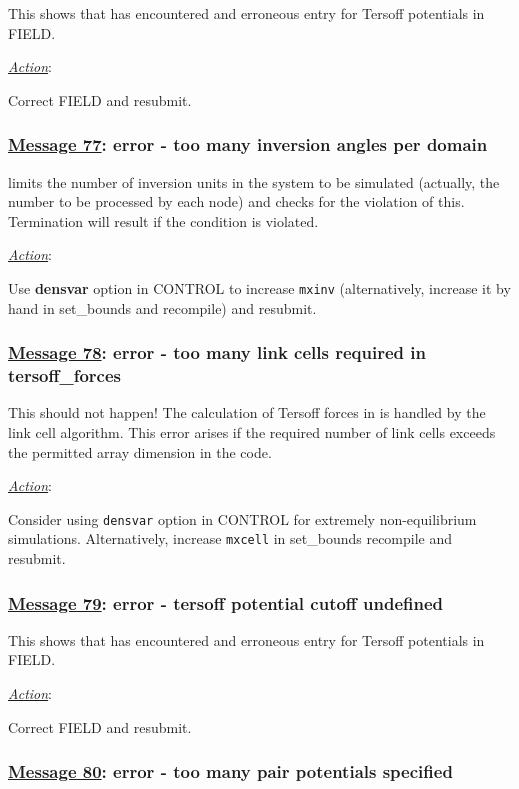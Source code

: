 This shows that \D has encountered and erroneous entry for Tersoff
potentials in FIELD.

\noindent \underline{\em Action}:

Correct FIELD and resubmit.

\subsubsection*{\underline{Message 77}: error - too many inversion angles per domain}

\D limits the number of inversion units
in the system to be simulated (actually, the number to be processed
by each node) and checks for the violation of this.  Termination will
result if the condition is violated.

\noindent \underline{\em Action}:

Use {\bf densvar} option in CONTROL to increase {\tt mxinv}
(alternatively, increase it by hand in {\sc set\_bounds} and
recompile) and resubmit.

\subsubsection*{\underline{Message 78}: error - too many link cells required in tersoff\_forces}

This should not happen!  The calculation of Tersoff
forces in \D is handled by the link cell
algorithm.  This error arises if the required number of link cells
exceeds the permitted array dimension in the code.

\noindent \underline{\em Action}:

Consider using {\tt densvar} option in CONTROL for extremely
non-equilibrium simulations.  Alternatively, increase {\tt mxcell}
in {\sc set\_bounds} recompile and resubmit.

\subsubsection*{\underline{Message 79}: error - tersoff potential cutoff undefined}

This shows that \D has encountered and erroneous entry for Tersoff
potentials in FIELD.

\noindent \underline{\em Action}:

Correct FIELD and resubmit.

\subsubsection*{\underline{Message 80}: error - too many pair potentials specified}

